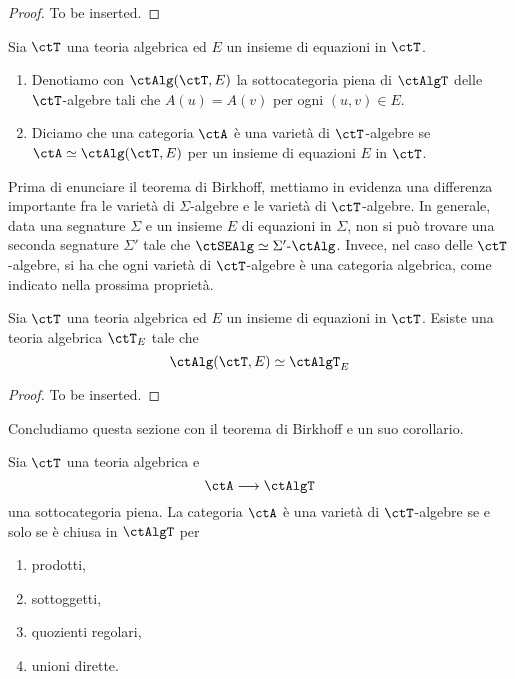 \begin{proof}
	To be inserted.
\end{proof}

\begin{definition}\label{def_var_AlgT}
	Sia \(\ctT\) una teoria algebrica ed \(E\) un insieme di equazioni in \(\ctT\).
	\begin{enumerate}
		\item Denotiamo con \(\ctAlg(\ctT,E)\) la sottocategoria piena di \(\ctAlgT\) delle \(\ctT\)-algebre tali che \(A(u)=A(v)\) per ogni \((u,v) \in E\).
		\item Diciamo che una categoria \(\ctA\) è una varietà di \(\ctT\)-algebre se \(\ctA \simeq \ctAlg(\ctT,E)\) per un insieme di equazioni \(E\) in \(\ctT\).
	\end{enumerate}
\end{definition}

Prima di enunciare il teorema di Birkhoff, mettiamo in evidenza una differenza importante fra le varietà di \(\Sigma\)-algebre e le varietà di
\(\ctT\)-algebre. In generale, data una segnature \(\Sigma\) e un insieme \(E\) di equazioni in \(\Sigma\), non si può trovare una seconda
segnature \(\Sigma'\) tale che \(\ctSEAlg \simeq \Sigma'\mbox{-}\ctAlg\). Invece, nel caso delle \(\ctT\)-algebre, si ha che ogni varietà di
\(\ctT\)-algebre è una categoria algebrica, come indicato nella prossima proprietà.

\begin{proposition}\label{prop_var_alg_alg}
	Sia \(\ctT\) una teoria algebrica ed \(E\) un insieme di equazioni in \(\ctT\). Esiste una teoria algebrica \(\ctT_E\) tale che
	\[
		\ctAlg(\ctT,E) \simeq \ctAlgT_{E}
	\]
\end{proposition}

\begin{proof}
	To be inserted.
\end{proof}

Concludiamo questa sezione con il teorema di Birkhoff e un suo corollario.

\begin{theorem}\label{teo_Birkhoff_AlgT}
	Sia \(\ctT\) una teoria algebrica e
	\[
		\ctA \fun \ctAlgT
	\]
	una sottocategoria piena. La categoria \(\ctA\) è una varietà di \(\ctT\)-algebre se e solo se è chiusa in \(\ctAlgT\) per
	\begin{enumerate}
		\item prodotti,
		\item sottoggetti,
		\item quozienti regolari,
		\item unioni dirette.
	\end{enumerate}
\end{theorem}


